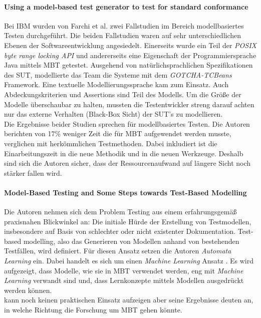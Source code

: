 \paragraph{Using a model-based test generator to test for standard conformance \cite{farchi_using_2002}}\label{sec:ibm_fallstudie}
Bei IBM wurden von Farchi et al. zwei Fallstudien im Bereich modellbasiertes Testen durchgeführt. Die beiden Fallstudien waren auf sehr unterschiedlichen Ebenen der Softwareentwicklung angesiedelt. Einerseits wurde ein Teil der \textit{POSIX byte range locking API} \cite{posix_2008} und andererseits eine Eigenschaft der Programmiersprache Java mittels \Gls{MBT} getestet. Ausgehend von natürlichsprachlichen Spezifikationen des \Gls{SUT}, modellierte das Team die Systeme mit dem \textit{GOTCHA-TCBeans} Framework. Eine textuelle Modellierungssprache kam zum Einsatz. Auch Abdeckungskriterien und Assertions sind Teil des Modells. Um die Größe der Modelle überschaubar zu halten, mussten die Testentwickler streng darauf achten nur das externe Verhalten (Black-Box Sicht) der SUT's zu modellieren.\\
Die Ergebnisse beider Studien sprechen für modellbasiertes Testen. Die Autoren berichten von 17\% weniger Zeit die für \Gls{MBT} aufgewendet werden musste, verglichen mit herkömmlichen Testmethoden. Dabei inkludiert ist die Einarbeitungszeit in die neue Methodik und in die neuen Werkzeuge. Deshalb sind sich die Autoren sicher, dass der Ressourcenaufwand auf längere Sicht noch stärker fallen wird.

\paragraph{Model-Based Testing and Some Steps towards Test-Based Modelling \cite{tretmans_model-based_2011}} \label{sec:test_based_modelling} Die Autoren nehmen sich dem Problem Testing aus einem erfahrungsgemäß praxisnahen Blickwinkel an: Die initiale Hürde der Erstellung von Testmodellen, insbesondere auf Basis von schlechter oder nicht existenter Dokumentation. Test-based modelling, also das Generieren von Modellen anhand von bestehenden Testfällen, wird definiert. Für diesen Ansatz setzen die Autoren \textit{Automata Learning} ein. Dabei handelt es sich um einen \textit{Machine Learning} Ansatz \cite{narendra_learning_1974}. Es wird aufgezeigt, dass Modelle, wie sie in \Gls{MBT} verwendet werden, eng mit \textit{Machine Learning} verwandt sind und, dass Lernkonzepte mittels Modellen ausgedrückt werden können.\\
\citeauthor{tretmans_model-based_2011} kann noch keinen praktischen Einsatz aufzeigen aber seine Ergebnisse deuten an, in welche Richtung die Forschung um \Gls{MBT} gehen könnte.

